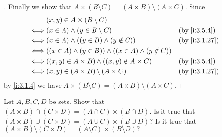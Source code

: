 \begin{proof}[]
  Finally we show that \(A \times (B \setminus C) = (A \times B) \setminus (A \times C)\).
  Since
  \begin{align*}
         & (x, y) \in A \times (B \setminus C)                                                 \\
    \iff & (x \in A) \land (y \in B \setminus C)                            &  & \by{i:3.5.4}  \\
    \iff & (x \in A) \land ((y \in B) \land (y \notin C))                   &  & \by{i:3.1.27} \\
    \iff & ((x \in A) \land (y \in B)) \land ((x \in A) \land (y \notin C))                    \\
    \iff & ((x, y) \in A \times B) \land ((x, y) \notin A \times C)         &  & \by{i:3.5.4}  \\
    \iff & (x, y) \in (A \times B) \setminus (A \times C),                  &  & \by{i:3.1.27}
  \end{align*}
  by \cref{i:3.1.4} we have \(A \times (B \setminus C) = (A \times B) \setminus (A \times C)\).
\end{proof}

\begin{ex}\label{i:ex:3.5.5}
  Let \(A, B, C, D\) be sets.
  Show that \((A \times B) \cap (C \times D) = (A \cap C) \times (B \cap D)\).
  Is it true that \((A \times B) \cup (C \times D) = (A \cup C) \times (B \cup D)?\)
  Is it true that \((A \times B) \setminus (C \times D) = (A \setminus C) \times (B \setminus D)?\)
\end{ex}

